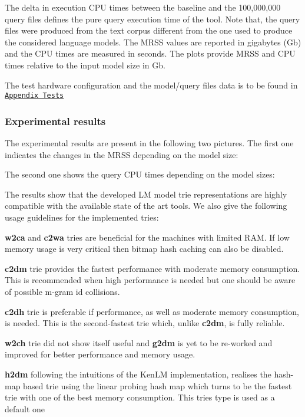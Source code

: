The delta in execution C\+P\+U times between the baseline and the 100,000,000 query files defines the pure query execution time of the tool. Note that, the query files were produced from the text corpus different from the one used to produce the considered language models. The M\+R\+S\+S values are reported in gigabytes (Gb) and the C\+P\+U times are measured in seconds. The plots provide M\+R\+S\+S and C\+P\+U times relative to the input model size in Gb.

The test hardware configuration and the model/query files\textquotesingle{} data is to be found in \href{#appendix-tests}{\tt Appendix Tests}

\subsubsection*{Experimental results}

The experimental results are present in the following two pictures. The first one indicates the changes in the M\+R\+S\+S depending on the model size\+:



The second one shows the query C\+P\+U times depending on the model sizes\+:



The results show that the developed L\+M model trie representations are highly compatible with the available state of the art tools. We also give the following usage guidelines for the implemented tries\+:


\begin{DoxyItemize}
\item {\bfseries w2ca} and {\bfseries c2wa} tries are beneficial for the machines with limited R\+A\+M. If low memory usage is very critical then bitmap hash caching can also be disabled.
\item {\bfseries c2dm} trie provides the fastest performance with moderate memory consumption. This is recommended when high performance is needed but one should be aware of possible m-\/gram id collisions.
\item {\bfseries c2dh} trie is preferable if performance, as well as moderate memory consumption, is needed. This is the second-\/fastest trie which, unlike {\bfseries c2dm}, is fully reliable.
\item {\bfseries w2ch} trie did not show itself useful and {\bfseries g2dm} is yet to be re-\/worked and improved for better performance and memory usage.
\item {\bfseries h2dm} following the intuitions of the Ken\+L\+M implementation, realises the hash-\/map based trie using the linear probing hash map which turns to be the fastest trie with one of the best memory consumption. This tries type is used as a default one
\end{DoxyItemize}

